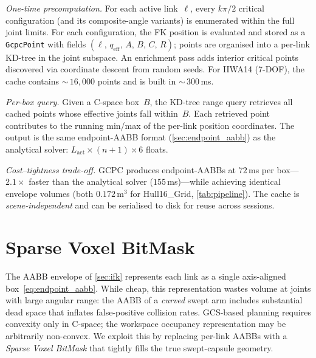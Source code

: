 \documentclass[journal]{IEEEtran}
\begin{document}
\emph{One-time precomputation.}
For each active link~$\ell$, every $k\pi/2$ critical configuration
(and its composite-angle variants) is enumerated within the full
joint limits.
For each configuration, the FK position is evaluated and stored as
a \texttt{GcpcPoint} with fields
$(\ell,\, q_\text{eff},\, A,\, B,\, C,\, R)$;
points are organised into a per-link KD-tree in the joint subspace.
An enrichment pass adds interior critical points discovered
via coordinate descent from random seeds.
For IIWA14 (7-DOF), the cache contains $\sim$\,$16{,}000$ points
and is built in $\sim$\,$300$\,ms.

\emph{Per-box query.}
Given a C-space box~$B$, the KD-tree range query retrieves all
cached points whose effective joints fall within~$B$.
Each retrieved point contributes to the running min/max
of the per-link position coordinates.
The output is the same endpoint-AABB format
(\cref{sec:endpoint_aabb}) as the analytical solver:
$L_\text{act} \times (n{+}1) \times 6$ floats.

\emph{Cost--tightness trade-off.}
GCPC produces endpoint-AABBs at $72$\,ms per box---$2.1{\times}$
faster than the analytical solver ($155$\,ms)---while achieving
identical envelope volumes (both $0.172$\,m$^3$ for Hull16\_Grid,
\cref{tab:pipeline}).
The cache is \emph{scene-independent} and can be serialised to
disk for reuse across sessions.

\section{Sparse Voxel BitMask}\label{sec:voxel}


The AABB envelope of \cref{sec:ifk} represents each link as a single
axis-aligned box~\eqref{eq:endpoint_aabb}.
While cheap, this representation wastes volume at joints with
large angular range: the AABB of a \emph{curved} swept arm includes
substantial dead space that inflates false-positive collision rates.
GCS-based planning requires convexity only in C-space; the workspace
occupancy representation may be arbitrarily non-convex.
We exploit this by replacing per-link AABBs with a
\emph{Sparse Voxel BitMask} that tightly fills the true
swept-capsule geometry.
\end{document}
